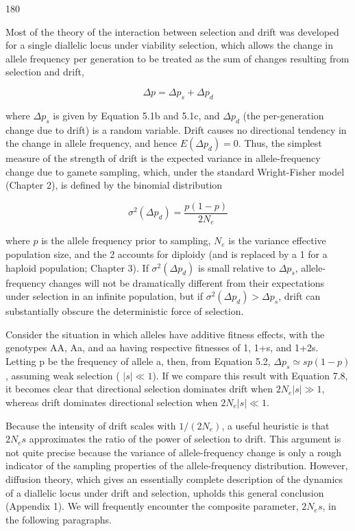 \documentclass{article}
\begin{document}
180

Most of the theory of the interaction between selection and drift was developed for a single diallelic locus under viability selection, which allows the change in allele frequency per generation to be treated as the sum of changes resulting from selection and drift,

\begin{equation}
\Delta p=\Delta p_{s}+\Delta p_{d}
\end{equation}

where  $ \Delta p_s $ is given by Equation 5.1b and 5.1c, and  $ \Delta p_d $ (the per-generation change due to drift) is a random variable. Drift causes no directional tendency in the change in allele frequency, and hence  $ E(\Delta p_d) = 0 $. Thus, the simplest measure of the strength of drift is the expected variance in allele-frequency change due to gamete sampling, which, under the standard Wright-Fisher model (Chapter 2), is defined by the binomial distribution

\begin{equation}
\sigma^{2}(\Delta p_{d})=\frac{p(1-p)}{2N_{e}}
\tag{7.8}
\label{eq:7_8}
\end{equation}

where $p$ is the allele frequency prior to sampling, $N_e$ is the variance effective population size, and the 2 accounts for diploidy (and is replaced by a 1 for a haploid population; Chapter 3). If $\sigma^2(\Delta p_d)$ is small relative to $\Delta p_s$, allele-frequency changes will not be dramatically different from their expectations under selection in an infinite population, but if $\sigma^2(\Delta p_d) > \Delta p_s$, drift can substantially obscure the deterministic force of selection.

Consider the situation in which alleles have additive fitness effects, with the genotypes AA, Aa, and aa having respective fitnesses of 1, 1+s, and 1+2s. Letting p be the frequency of allele a, then, from Equation 5.2,  $ \Delta p_s \simeq sp(1-p) $, assuming weak selection ( $ |s| \ll 1 $). If we compare this result with Equation 7.8, it becomes clear that directional selection dominates drift when  $ 2N_e|s| \gg 1 $, whereas drift dominates directional selection when  $ 2N_e|s| \ll 1 $.

Because the intensity of drift scales with  $ 1/(2N_e) $, a useful heuristic is that  $ 2N_e s $ approximates the ratio of the power of selection to drift. This argument is not quite precise because the variance of allele-frequency change is only a rough indicator of the sampling properties of the allele-frequency distribution. However, diffusion theory, which gives an essentially complete description of the dynamics of a diallelic locus under drift and selection, upholds this general conclusion (Appendix 1). We will frequently encounter the composite parameter,  $ 2N_e s $, in the following paragraphs.
\end{document}

